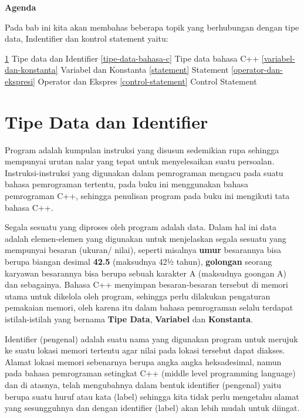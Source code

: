 \textbf{Agenda}

Pada bab ini kita akan membahas beberapa topik yang berhubungan dengan tipe data, Indentifier dan kontrol statement yaitu:

\begin{outline}
	\1 \ref{tipe-data-dan-identifier} Tipe data dan Identifier
	\1 \ref{tipe-data-bahasa-c} Tipe data bahasa C++
	\1 \ref{variabel-dan-konstanta} Variabel dan Konstanta
	\1 \ref{statement} Statement
	\1 \ref{operator-dan-ekspresi} Operator dan Ekspres
	\1 \ref{control-statement} Control Statement
\end{outline}

\section{Tipe Data dan
Identifier}\label{tipe-data-dan-identifier}

Program adalah kumpulan instruksi yang disusun sedemikian rupa sehingga
mempunyai urutan nalar yang tepat untuk menyelesaikan suatu persoalan.
Instruksi-instruksi yang digunakan dalam pemrograman mengacu pada suatu
bahasa pemrograman tertentu, pada buku ini menggunakan bahasa
pemrograman C++, sehingga penulisan program pada buku ini mengikuti tata
bahasa C++.

Segala sesuatu yang diproses oleh program adalah data. Dalam hal ini
data adalah elemen-elemen yang digunakan untuk menjelaskan segala
sesuatu yang mempunyai besaran (ukuran/ nilai), seperti misalnya
\textbf{umur} besarannya bisa berupa biangan desimal \textbf{42.5}
(maksudnya 42½ tahun), \textbf{golongan} seorang karyawan besarannya
bisa berupa sebuah karakter A (maksudnya goongan A) dan sebagainya.
Bahasa C++ menyimpan besaran-besaran tersebut di memori utama untuk
dikelola oleh program, sehingga perlu dilakukan pengaturan pemakaian
memori, oleh karena itu dalam bahasa pemrograman selalu terdapat
istilah-istilah yang bernama \textbf{Tipe Data}, \textbf{Variabel} dan
\textbf{Konstanta}.

Identifier (pengenal) adalah suatu nama yang digunakan program untuk
merujuk ke suatu lokasi memori tertentu agar nilai pada lokasi tersebut
dapat diakses. Alamat lokasi memori sebenarnya berupa angka angka
heksadesimal, namun pada bahasa pemrograman
setingkat C++ (middle level programming language) dan di atasnya, telah
mengubahnya dalam bentuk identifier (pengenal) yaitu berupa suatu huruf
atau kata (label) sehingga kita tidak perlu mengetahu alamat yang
sesungguhnya dan dengan identifier (label) akan lebih mudah untuk
diingat.

